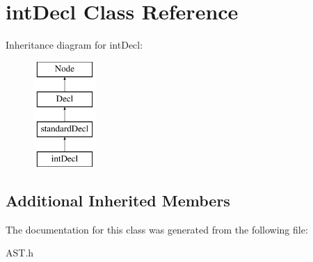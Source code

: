 \hypertarget{classintDecl}{\section{int\-Decl Class Reference}
\label{classintDecl}
}
Inheritance diagram for int\-Decl\-:\begin{figure}[H]
\begin{center}
\leavevmode
\includegraphics[height=4.000000cm]{classintDecl}
\end{center}
\end{figure}
\subsection*{Additional Inherited Members}


The documentation for this class was generated from the following file\-:\begin{DoxyCompactItemize}
\item 
A\-S\-T.\-h\end{DoxyCompactItemize}
